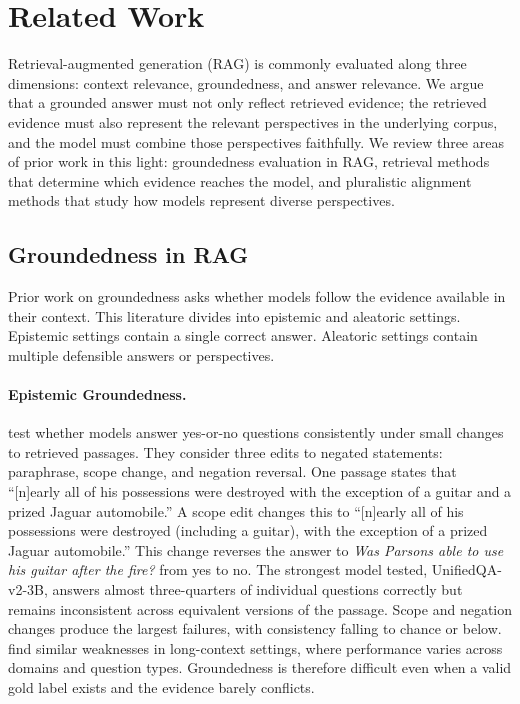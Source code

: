 \section{Related Work}
\label{sec:related_work}

Retrieval-augmented generation (RAG) is commonly evaluated along three dimensions: context relevance, groundedness, and answer relevance. We argue that a grounded answer must not only reflect retrieved evidence; the retrieved evidence must also represent the relevant perspectives in the underlying corpus, and the model must combine those perspectives faithfully. We review three areas of prior work in this light: groundedness evaluation in RAG, retrieval methods that determine which evidence reaches the model, and pluralistic alignment methods that study how models represent diverse perspectives.

\subsection{Groundedness in RAG}

Prior work on groundedness asks whether models follow the evidence available in their context. This literature divides into epistemic and aleatoric settings. Epistemic settings contain a single correct answer. Aleatoric settings contain multiple defensible answers or perspectives.

\paragraph{Epistemic Groundedness.}
\citet{ravichander-etal-2022-condaqa} test whether models answer yes-or-no questions consistently under small changes to retrieved passages. They consider three edits to negated statements: paraphrase, scope change, and negation reversal. One passage states that ``[n]early all of his possessions were destroyed with the exception of a guitar and a prized Jaguar automobile.'' A scope edit changes this to ``[n]early all of his possessions were destroyed (including a guitar), with the exception of a prized Jaguar automobile.'' This change reverses the answer to \textit{Was Parsons able to use his guitar after the fire?} from yes to no. The strongest model tested, UnifiedQA-v2-3B, answers almost three-quarters of individual questions correctly but remains inconsistent across equivalent versions of the passage. Scope and negation changes produce the largest failures, with consistency falling to chance or below. \citet{qi-etal-2024-long2rag} find similar weaknesses in long-context settings, where performance varies across domains and question types. Groundedness is therefore difficult even when a valid gold label exists and the evidence barely conflicts.

